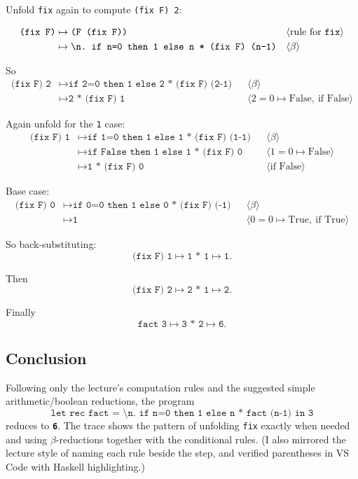 \documentclass[11pt]{article}
\begin{document}
Unfold \texttt{fix} again to compute \texttt{(fix F)\ 2}:

\begin{align*}
\texttt{(fix F)}
&\mapsto \texttt{(F (fix F))} && \langle\text{rule for \texttt{fix}}\rangle\\
&\mapsto \texttt{\textbackslash n.\ if n=0 then 1 else n * (fix F)\ (n-1)} && \langle\beta\rangle
\end{align*}

So
\begin{align*}
\texttt{(fix F)\ 2}
&\mapsto \texttt{if 2=0 then 1 else 2 * (fix F)\ (2-1)} && \langle\beta\rangle\\
&\mapsto \texttt{2 * (fix F)\ 1} && \langle 2=0 \mapsto \text{False},\ \text{if False}\rangle
\end{align*}

Again unfold for the \texttt{1} case:
\begin{align*}
\texttt{(fix F)\ 1}
&\mapsto \texttt{if 1=0 then 1 else 1 * (fix F)\ (1-1)} && \langle\beta\rangle\\
&\mapsto \texttt{if False then 1 else 1 * (fix F)\ 0} && \langle 1=0 \mapsto \text{False}\rangle\\
&\mapsto \texttt{1 * (fix F)\ 0} && \langle \text{if False}\rangle
\end{align*}

Base case:
\begin{align*}
\texttt{(fix F)\ 0}
&\mapsto \texttt{if 0=0 then 1 else 0 * (fix F)\ (-1)} && \langle\beta\rangle\\
&\mapsto \texttt{1} && \langle 0=0 \mapsto \text{True},\ \text{if True}\rangle
\end{align*}

So back-substituting:
\[
\texttt{(fix F)\ 1} \mapsto \texttt{1 * 1} \mapsto \texttt{1}.
\]

Then
\[
\texttt{(fix F)\ 2} \mapsto \texttt{2 * 1} \mapsto \texttt{2}.
\]

Finally
\[
\texttt{fact 3} \mapsto \texttt{3 * 2} \mapsto \texttt{6}.
\]

\subsection*{Conclusion}
Following only the lecture’s computation rules and the suggested simple arithmetic/boolean reductions, the program
\[
\texttt{let rec fact = \textbackslash n. if n=0 then 1 else n * fact (n-1) in 3}
\]
reduces to \textbf{\texttt{6}}. The trace shows the pattern of unfolding \texttt{fix} exactly when needed and using \(\beta\)-reductions together with the conditional rules. (I also mirrored the lecture style of naming each rule beside the step, and verified parentheses in VS Code with Haskell highlighting.)
\end{document}
